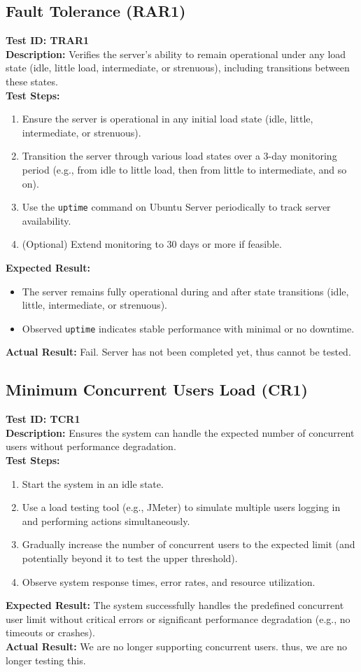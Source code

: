 \documentclass[12pt, titlepage]{article}
\begin{document}
\subsection{Fault Tolerance (RAR1)}
\textbf{Test ID: TRAR1}\\
\textbf{Description:} Verifies the server's ability to remain operational under any load state (idle, little load, intermediate, or strenuous), including transitions between these states.\\
\textbf{Test Steps:}
\begin{enumerate}
    \item Ensure the server is operational in any initial load state (idle, little, intermediate, or strenuous).
    \item Transition the server through various load states over a 3-day monitoring period (e.g., from idle to little load, then from little to intermediate, and so on).
    \item Use the \texttt{uptime} command on Ubuntu Server periodically to track server availability.
    \item (Optional) Extend monitoring to 30 days or more if feasible.
\end{enumerate}
\textbf{Expected Result:}
\begin{itemize}
    \item The server remains fully operational during and after state transitions (idle, little, intermediate, or strenuous).
    \item Observed \texttt{uptime} indicates stable performance with minimal or no downtime.
\end{itemize}
\textbf{Actual Result:} Fail. Server has not been completed yet, thus cannot be tested.

\subsection{Minimum Concurrent Users Load (CR1)}
\textbf{Test ID: TCR1}\\
\textbf{Description:} Ensures the system can handle the expected number of concurrent users without performance degradation.\\
\textbf{Test Steps:}
\begin{enumerate}
    \item Start the system in an idle state.
    \item Use a load testing tool (e.g., JMeter) to simulate multiple users logging in and performing actions simultaneously.
    \item Gradually increase the number of concurrent users to the expected limit (and potentially beyond it to test the upper threshold).
    \item Observe system response times, error rates, and resource utilization.
\end{enumerate}
\textbf{Expected Result:} The system successfully handles the predefined concurrent user limit without critical errors or significant performance degradation (e.g., no timeouts or crashes).\\
\textbf{Actual Result:} We are no longer supporting concurrent users. thus, we are no longer testing this.
\end{document}
